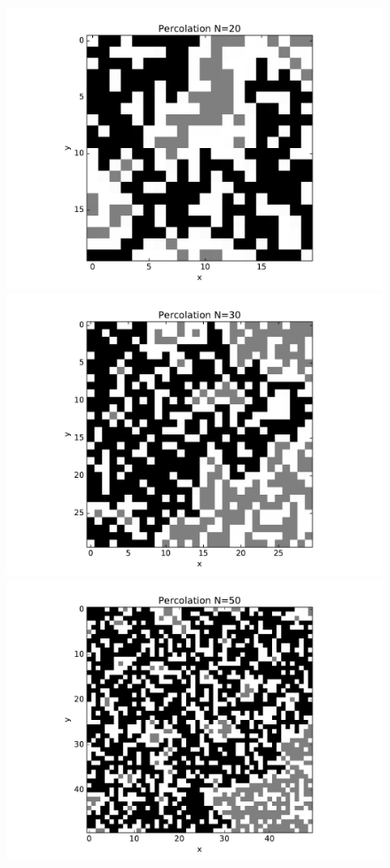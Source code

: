 \documentclass{article}
\begin{document}
\begin{figure}[H]
  \label{delta02}
\endminipage\hfill
{}
  \includegraphics[width=\linewidth]{percolation_20.pdf}
  \label{delta02}
\endminipage\hfill
{}
  \includegraphics[width=\linewidth]{percolation_30.pdf}
  \label{delta02}
\endminipage\hfill
{}
  \includegraphics[width=\linewidth]{percolation_50.pdf}
  \label{delta02}
\endminipage\hfill
\end{figure}
\end{document}
